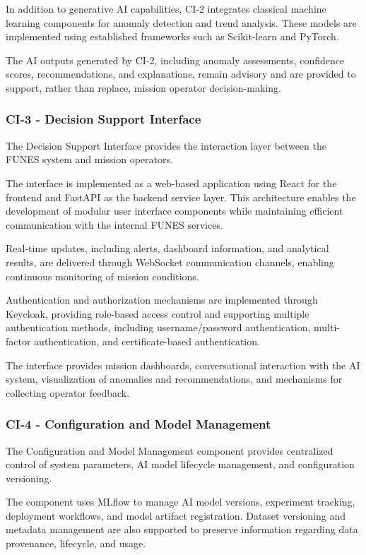 In addition to generative AI capabilities, CI-2 integrates classical machine learning components for anomaly detection and trend analysis. These models are implemented using established frameworks such as Scikit-learn and PyTorch.

The AI outputs generated by CI-2, including anomaly assessments, confidence scores, recommendations, and explanations, remain advisory and are provided to support, rather than replace, mission operator decision-making.

\subsubsection{CI-3 - Decision Support Interface}

The Decision Support Interface provides the interaction layer between the FUNES system and mission operators.

The interface is implemented as a web-based application using React for the frontend and FastAPI as the backend service layer. This architecture enables the development of modular user interface components while maintaining efficient communication with the internal FUNES services.

Real-time updates, including alerts, dashboard information, and analytical results, are delivered through WebSocket communication channels, enabling continuous monitoring of mission conditions.

Authentication and authorization mechanisms are implemented through Keycloak, providing role-based access control and supporting multiple authentication methods, including username/password authentication, multi-factor authentication, and certificate-based authentication.

The interface provides mission dashboards, conversational interaction with the AI system, visualization of anomalies and recommendations, and mechanisms for collecting operator feedback.

\subsubsection{CI-4 - Configuration and Model Management}

The Configuration and Model Management component provides centralized control of system parameters, AI model lifecycle management, and configuration versioning.

The component uses MLflow to manage AI model versions, experiment tracking, deployment workflows, and model artifact registration. Dataset versioning and metadata management are also supported to preserve information regarding data provenance, lifecycle, and usage.

